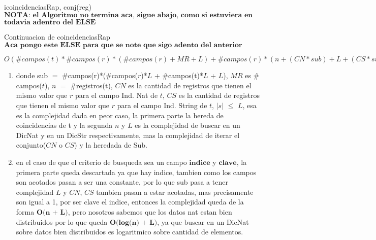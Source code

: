 \begin{Algoritmos}
\begin{algoritmo}{icoincidenciasRap}{, }{conj(reg)}
{{{        }
	}
  $\textbf{NOTA: el Algoritmo no termina aca, sigue abajo, como si estuviera en esta parte, osea}$
  $\textbf{todavia adentro del ELSE}$
  }
  \end{algoritmo}
  \begin{algoritmo}{Continuacion de coincidenciasRap}{}{}
  $\textbf{Aca pongo este ELSE para que se note que sigo adento del anterior}$
  \end{algoritmo}
  \datosAlgoritmo{} %
  {}  %
  {}  %
  {$O(\#campos(t)*\#campos(r)*(\#campos(r)+MR+L)+\#campos(r)*(n+(CN*sub)+L+(CS*sub) + \#indices(t)*L))$} %
  { 
  	\begin{enumerate}
		\item donde sub $=$ $\#$campos(r)*($\#$campos($r$)*$L$ + $\#$campos(t)*$L$ + $L$), $MR$ es $\#$campos($t$), $n$ $=$ $\#$registros(t), $CN$ es la cantidad de registros que tienen el mismo valor que $r$ para el campo Ind. Nat de $t$, $CS$ es la cantidad de registros que tienen el mismo valor que $r$ para el campo Ind. String de $t$, $|s|$ $\leq$ $L$, esa es la complejidad dada en peor caso, la primera parte la hereda de coincidencias de t y la segunda $n$ y $L$ es la complejidad de buscar en un DicNat y en un DicStr respectivamente, mas la complejidad de iterar el conjunto($CN$ o $CS$) y la heredada de Sub. 
    	\item en el caso de que el criterio de busqueda sea un campo $\textbf{indice}$ y $\textbf{clave}$, la primera parte queda descartada ya que hay indice, tambien como los campos son acotados pasan a ser una constante, por lo que sub pasa a tener complejidad $L$ y $CN$, $CS$ tambien pasan a estar acotadas, mas precisamente son igual a 1, por ser clave el indice, entonces la complejidad queda de la forma $\textbf{O(n + L)}$, pero nosotros sabemos que los datos nat estan bien distribuidos por lo que queda $\textbf{O(log(n) + L)}$, ya que buscar en un DicNat sobre datos bien distribuidos es logaritmico sobre cantidad de elementos.   
	\end{enumerate}
	}
    

\end{Algoritmos}
